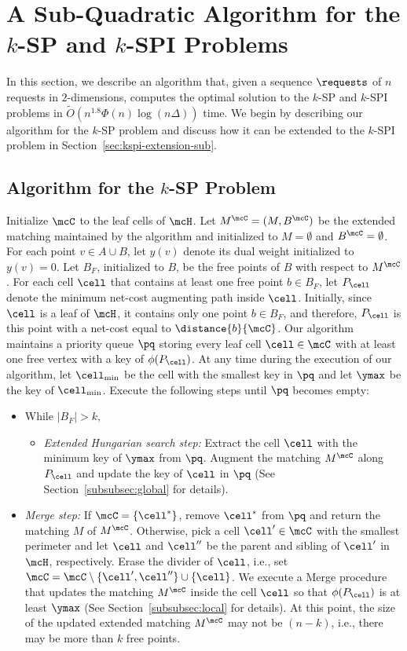 \section{A Sub-Quadratic Algorithm for the \texorpdfstring{$k$}{}-SP and \texorpdfstring{$k$}{}-SPI Problems}\label{sec:k-seq}
In this section, we describe an algorithm that, given a sequence $\requests$ of $n$ requests in $2$-dimensions, computes the optimal solution to the $k$-SP and $k$-SPI problems in $\tilde{O}(n^{1.8}\Phi(n)\log(n\Delta))$ time. We begin by describing our algorithm for the $k$-SP problem and discuss how it can be extended to the $k$-SPI problem in Section~\ref{sec:kspi-extension-sub}.


\subsection{Algorithm for the \texorpdfstring{$k$}{}-SP Problem}
Initialize $\mcC$ to the leaf cells of $\mcH$. Let $M^{\mcC}=(M, B^{\mcC})$ be the extended matching maintained by the algorithm and initialized to $M=\emptyset$ and $B^{\mcC}=\emptyset$. For each point $v \in A\cup B$, let $y(v)$ denote its dual weight initialized to $y(v)=0$. Let $B_F$, initialized to $B$, be the free points of $B$ with respect to $M^{\mcC}$. For each cell $\cell$ that contains at least one free point $b \in B_F$, let $P_\cell$ denote the minimum net-cost augmenting path inside $\cell$. Initially, since $\cell$ is a leaf of $\mcH$, it contains only one point $b \in B_F$, and therefore, $P_{\cell}$ is this point with a net-cost equal to $\distance{b}{\mcC}$. Our algorithm maintains a priority queue $\pq$ storing every leaf cell $\cell\in\mcC$ with at least one free vertex with a key of $\phi(P_\cell)$. 
At any time during the execution of our algorithm, let $\cell_{\min}$ be the cell with the smallest key in $\pq$ and let $\ymax$ be the key of $\cell_{\min}$.
Execute the following steps until $\pq$ becomes empty:

\begin{itemize}
    \item While $|B_F| > k$, 
    \begin{itemize}
        \item {\it Extended Hungarian search step:} Extract the cell $\cell$ with the minimum key of $\ymax$ from $\pq$. Augment the matching $M^\mcC$ along $P_\cell$ and update the key of $\cell$ in $\pq$ (See Section~\ref{subsubsec:global} for details).
    \end{itemize}
    \item {\it Merge step:} If $\mcC=\{\cell^*\}$, remove $\cell^*$ from $\pq$ and return the matching $M$ of $M^{\mcC}$. Otherwise, pick a cell $\cell'\in\mcC$ with the smallest perimeter and let $\cell$ and $\cell''$ be the parent and sibling of $\cell'$ in $\mcH$, respectively. Erase the divider of $\cell$, i.e., set $\mcC=\mcC\setminus\{\cell',\cell''\}\cup \{\cell\}$. 
    We execute a Merge procedure that updates the matching $M^\mcC$ inside the cell $\cell$ so that $\phi(P_\cell)$ is at least $\ymax$ (See Section~\ref{subsubsec:local} for details). At this point, the size of the updated extended matching $M^{\mcC}$ may not be $(n-k)$, i.e., there may be more than $k$ free points.
\end{itemize}

